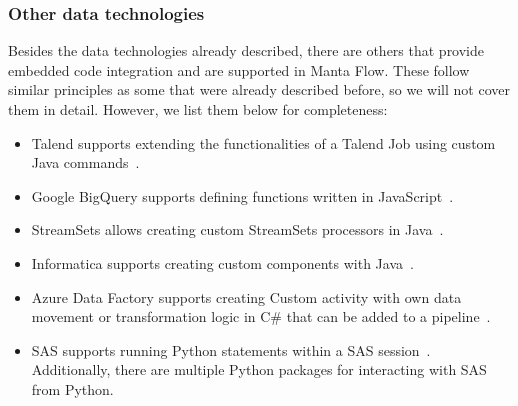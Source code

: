 \subsubsection{Other data technologies}
Besides the data technologies already described, there are others that provide embedded code integration and are supported in Manta Flow. These follow similar principles as some that were already described before, so we will not cover them in detail. However, we list them below for completeness:
\begin{itemize}
    \item Talend supports extending the functionalities of a Talend Job using custom Java commands~\cite{talend}.
    \item Google BigQuery supports defining functions written in JavaScript~\cite{bigquery}.
    \item StreamSets allows creating custom StreamSets processors in Java~\cite{streamsets}.
    \item Informatica supports creating custom components with Java~\cite{informatica}.
    \item Azure Data Factory supports creating Custom activity with own data movement or transformation logic in C\# that can be added to a pipeline~\cite{adf}.
    \item SAS supports running Python statements within a SAS session~\cite{sas}. Additionally, there are multiple Python packages for interacting with SAS from Python.
\end{itemize}

